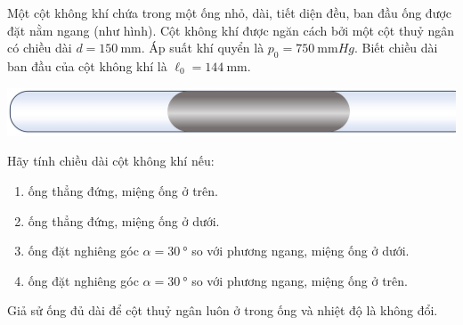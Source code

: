 \begin{vd}
	Một cột không khí chứa trong một ống nhỏ, dài, tiết diện đều, ban đầu ống được đặt nằm ngang (như hình). Cột không khí được ngăn cách bởi một cột thuỷ ngân có chiều dài $d=\SI{150}{\milli\meter}$. Áp suất khí quyển là $p_0=\SI{750}{\milli\meter Hg}$. Biết chiều dài ban đầu của cột không khí là $\ell_0=\SI{144}{\milli\meter}$.
		\begin{center}
			\includegraphics[width=0.4\linewidth]{figs/VN12-Y24-PH-SYL-010-3}
		\end{center}
		Hãy tính chiều dài cột không khí nếu:
		\begin{enumerate}[label=\alph*)]
			\item ống thẳng đứng, miệng ống ở trên.
			\item ống thẳng đứng, miệng ống ở dưới.
			\item ống đặt nghiêng góc $\alpha=\SI{30}{\degree}$ so với phương ngang, miệng ống ở dưới.
			\item ống đặt nghiêng góc $\alpha=\SI{30}{\degree}$ so với phương ngang, miệng ống ở trên.
		\end{enumerate}
		Giả sử ống đủ dài để cột thuỷ ngân luôn ở trong ống và nhiệt độ là không đổi.
\end{vd}
